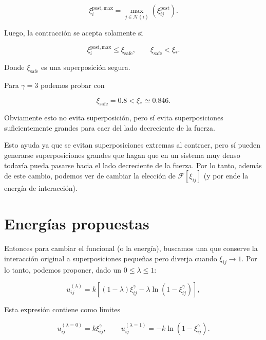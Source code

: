 \documentclass[11pt,a4paper]{article}
\begin{document}
\begin{equation}
\xi_{i}^{\mathrm{post,max}}
=
\max_{j\in\mathcal N(i)}
\left(
\xi_{ij}^{\mathrm{post}}
\right).
\end{equation}

Luego, la contracción se acepta solamente si

\begin{equation}
\boxed{
\xi_{i}^{\mathrm{post,max}}
\leq
\xi_{\mathrm{safe}}
},
\qquad
\xi_{\mathrm{safe}}<\xi_*.
\label{eq:contraction_condition}
\end{equation}

Donde $\xi_{\mathrm{safe}}$ es una superposición segura.

Para $\gamma=3$ podemos probar con

\begin{equation}
\xi_{\mathrm{safe}}=0.8
<
\xi_*
\simeq0.846.
\end{equation}

Obviamente esto no evita superposición, pero sí evita superposiciones suficientemente grandes para caer del lado decreciente de la fuerza.

Esto ayuda ya que se evitan superposiciones extremas al contraer, pero sí pueden generarse superposiciones grandes que hagan que en un sistema muy denso todavía pueda pasarse hacia el lado decreciente de la fuerza. Por lo tanto, además de este cambio, podemos ver de cambiar la elección de $\mathcal{F}[\xi_{ij}]$ (y por ende la energía de interacción).

\section{Energías propuestas}

Entonces para cambiar el funcional (o la energía), buscamos una que conserve la interacción original a superposiciones pequeñas pero diverja cuando $\xi_{ij}\rightarrow 1$. Por lo tanto, podemos proponer, dado un $0\leq\lambda\leq1$:

\begin{equation}
\boxed{
u_{ij}^{(\lambda)}
=
k\left[
(1-\lambda)\xi_{ij}^{\gamma}
-
\lambda\ln\left(1-\xi_{ij}^{\gamma}\right)
\right]
},
\label{eq:regularized_energy}
\end{equation}

Esta expresión contiene como límites

\begin{equation}
u_{ij}^{(\lambda=0)}
=k\xi_{ij}^{\gamma},
\qquad
u_{ij}^{(\lambda=1)}
=-k\ln\left(1-\xi_{ij}^{\gamma}\right).
\end{equation}
\end{document}
